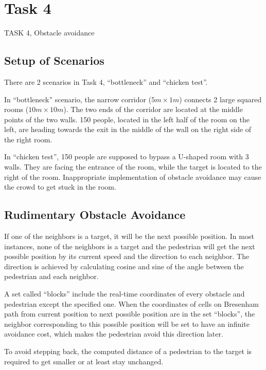 \documentclass[10pt,a4paper]{article}
\begin{document}
\section{Task 4}

\begin{task}{TASK 4, Obstacle avoidance}

\subsection{Setup of Scenarios}
There are 2 scenarios in Task 4, ``bottleneck'' and ``chicken test''. 

In ``bottleneck'' scenario, the narrow corridor ($5m \times 1m $) connects 2 large squared rooms ($10m \times 10m$). The two ends of the corridor are located at the middle points of the two walls. 150 people, located in the left half of the room on the left, are heading towards the exit in the middle of the wall on the right side of the right room.

In ``chicken test'', 150 people are supposed to bypass a U-shaped room with 3 walls. They are facing the entrance of the room, while the target is located to the right of the room. Inappropriate implementation of obstacle avoidance may cause the crowd to get stuck in the room.


\subsection{Rudimentary Obstacle Avoidance}
If one of the neighbors is a target, it will be the next possible position. In most instances, none of the neighbors is a target and the pedestrian will get the next possible position by its current speed and the direction to each neighbor. The direction is achieved by calculating cosine and sine of the angle between the pedestrian and each neighbor.

A set called ``blocks'' include the real-time coordinates of every obstacle and pedestrian except the specified one. When the coordinates of cells on Bresenham path from current position to next possible position are in the set ``blocks'', the neighbor corresponding to this possible position will be set to have an infinite avoidance cost, which makes the pedestrian avoid this direction later.

To avoid stepping back, the computed distance of a pedestrian to the target is required to get smaller or at least stay unchanged.


\end{task}
\end{document}
